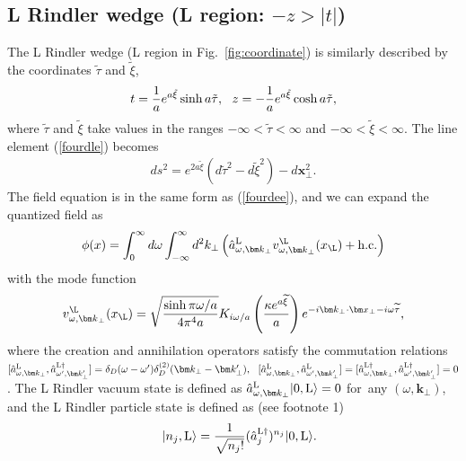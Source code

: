 \documentclass[aps,prd,preprintnumbers,nofootinbib,showpacs]{revtex4}%
\begin{document}
\begin{widetext}
\subsection{L Rindler wedge (L region: $-z>|t|$)}
The L Rindler wedge (L region in Fig.~\ref{fig:coordinate}) 
is similarly described by the coordinates $\tilde \tau$ and $\tilde\xi$, 
\begin{eqnarray}
t={1\over a}e^{a\tilde \xi}\sinh a\tilde \tau,~~
z=-{1\over a}e^{a\tilde \xi}\cosh a\tilde \tau,
\end{eqnarray}
where $\tilde \tau$ and $\tilde\xi$ take values in the ranges $-\infty<\tilde\tau<\infty$ and 
$-\infty<\tilde\xi<\infty$. The line element (\ref{fourdle}) becomes
\begin{eqnarray}
ds^2=e^{2a\tilde\xi}(d\tilde\tau^2-d\tilde\xi^2)-d\bm x_\perp^2.
\end{eqnarray}
The field equation is in the same form as (\ref{fourdee}), and 
we can expand the quantized field as
\begin{eqnarray}
\phi(x)=\int_{0}^{\infty} d \omega\int_{-\infty}^{\infty} d^2 k_\perp \left( {\hat a}_{\omega,{\bm k}_\perp}^{\rm L} v_{\omega,{\bm k}_\perp}^\L(x_\L)
+{\rm h.c.}
\right)
\label{qfL}
\end{eqnarray}
with the mode function
\begin{eqnarray}
v_{\omega,{\bm k}_\perp}^\L(x_\L)=\sqrt{\sinh \pi \omega/a\over 4\pi^4 a}
K_{i\omega/a}\left({\kappa e^{a\widetilde\xi}\over a}\right)e^{-i\bm k_\perp\cdot \bm x_\perp-i\omega\widetilde\tau},
\label{mfL}
\end{eqnarray}
where the creation and annihilation operators satisfy the commutation relations
$[{\hat a}^{\rm L}_{\omega,\bm k_\perp}, {\hat a}_{\omega',\bm k_\perp'}^{\rm L \dagger}]
=\delta_D(\omega-\omega') \delta_D^{(2)}(\bm k_\perp-\bm k_\perp'), 
~~
[{\hat a}^{\rm L}_{\omega,\bm k_\perp}, {\hat a}_{\omega',\bm k_\perp'}^{\rm L}]
=[{\hat a}^{\rm L \dagger}_{\omega,\bm k_\perp}, {\hat a}_{\omega',\bm k_\perp'}^{\rm L \dagger}]
=0
$. %
The L Rindler vacuum state is defined as 
$
\hat a_{\omega,\bm k_\perp}^{\rm L}|0,{\rm L}\rangle=0 
$
for~any $(\omega, \bm k_\perp)$, 
and the L Rindler particle state is defined as (see footnote 1) 
\begin{eqnarray}
&&|n_j,{\rm L}\rangle={1\over\sqrt{n_j!}}(\hat a_{j}^{\rm L \dagger})^{n_j}|0,{\rm L}\rangle.
\label{fourdLexcite}
\end{eqnarray}


\end{widetext}
\end{document}
